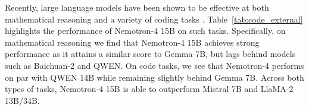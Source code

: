 \documentclass[11pt]{article}
\newcommand{\ours}{Nemotron-4}
\begin{document}
Recently, large language models have been shown to be effective at both mathematical reasoning and a variety of coding tasks \citep{allal2023santacoder,chowdhery2022palm, touvron2023llama}. Table~\ref{tab:code_external} highlights the performance of \ours{} 15B on such tasks. Specifically, on mathematical reasoning we find that \ours{} 15B achieves strong performance as it attains a similar score to Gemma 7B, but lags behind models such as Baichuan-2 and QWEN. On code tasks, we see that \ours{} performs on par with QWEN 14B while remaining slightly behind Gemma 7B. Across both types of tasks, \ours{} 15B is able to outperform Mistral 7B and LlaMA-2 13B/34B. 




\end{document}
